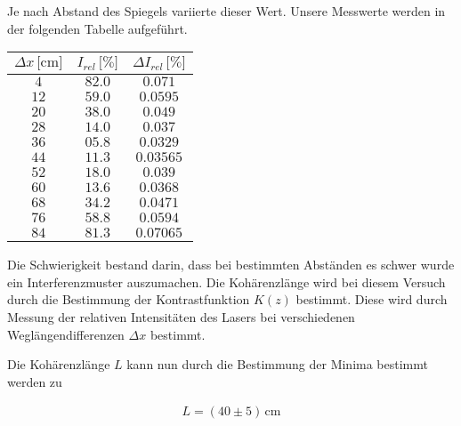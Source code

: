 Je nach Abstand des Spiegels variierte dieser Wert. Unsere Messwerte werden in der folgenden Tabelle aufgeführt.

\begin{center}
\begin{tabular}{c|c|c}
$\Delta x\, \text{[cm]}$ & $I_{rel}\,\text{[\%]}$ & $\Delta I_{rel}\, \text{[\%]}$ \\\hline
\(4\) & \(82.0\) & \(0.071\) \\ 
\(12\) & \(59.0\) & \(0.0595\) \\ 
\(20\) & \(38.0\) & \(0.049\) \\ 
\(28\) & \(14.0\) & \(0.037\) \\ 
\(36\) & \(05.8\) & \(0.0329\) \\ 
\(44\) & \(11.3\) & \(0.03565\) \\ 
\(52\) & \(18.0\) & \(0.039\) \\ 
\(60\) & \(13.6\) & \(0.0368\) \\ 
\(68\) & \(34.2\) & \(0.0471\) \\ 
\(76\) & \(58.8\) & \(0.0594\) \\ 
\(84\) & \(81.3\) & \(0.07065\)
\end{tabular}
\end{center}

Die Schwierigkeit bestand darin, dass bei bestimmten Abständen es schwer wurde ein Interferenzmuster auszumachen.
Die Kohärenzlänge wird bei diesem Versuch durch die Bestimmung der Kontrastfunktion $K(z)$ bestimmt. Diese wird durch Messung der relativen Intensitäten des Lasers bei verschiedenen Weglängendifferenzen $\Delta x$ bestimmt.


Die Kohärenzlänge $L$ kann nun durch die Bestimmung der Minima bestimmt werden zu

\begin{align}
L = (40 \pm 5)\, \text{cm}
\end{align}
